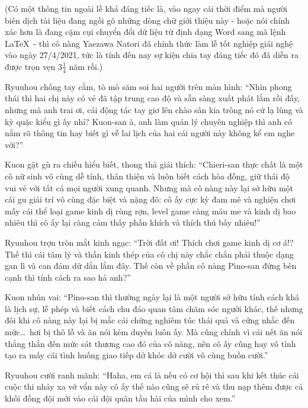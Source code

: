 \documentclass[../main.tex]{subfiles}
\begin{document}
(Có một thông tin ngoài lề khá đáng tiếc là, vào ngay cái thời điểm mà người biên dịch tài liệu đang ngồi gõ những dòng chữ giới thiệu này - hoặc nói chính xác hơn là đang cặm cụi chuyển đổi dữ liệu từ định dạng Word sang mã lệnh \LaTeX\ - thì cô nàng Yaezawa Natori đã chính thức làm lễ tốt nghiệp giải nghệ vào ngày 27/4/2021, tức là tính đến nay sự kiện chia tay đáng tiếc đó đã diễn ra được trọn vẹn 3\(\frac{1}{4}\) năm rồi.)

\chrint


Ryuuhou chống tay cằm, tò mò săm soi hai người trên màn hình: ``Nhìn phong thái thì hai chị này có vẻ đã tập trung cao độ và sẵn sàng xuất phát lắm rồi đấy, nhưng mà anh trai ơi, cái động tác tay giơ lên chào sân kia trông nó cứ lạ lùng và kỳ quặc kiểu gì ấy nhỉ? Kuon-san à, anh làm quản lý chuyên nghiệp thì anh có nắm rõ thông tin hay biết gì về lai lịch của hai cái người này không kể em nghe với?''

Kuon gật gù ra chiều hiểu biết, thong thả giải thích: ``Chieri-san thực chất là một cô nữ sinh vô cùng dễ tính, thân thiện và luôn biết cách hòa đồng, giữ thái độ vui vẻ với tất cả mọi người xung quanh. Nhưng mà cô nàng này lại sở hữu một cái gu giải trí vô cùng đặc biệt và nặng đô: cô ấy cực kỳ đam mê và nghiện chơi mấy cái thể loại game kinh dị rùng rợn, level game càng máu me và kinh dị bao nhiêu thì cô ấy lại càng cảm thấy phấn khích và thích thú bấy nhiêu!''

Ryuuhou trợn tròn mắt kinh ngạc: ``Trời đất ơi! Thích chơi game kinh dị cơ á!? Thế thì cái tâm lý và thần kinh thép của cô chị này chắc chắn phải thuộc dạng gan lì và can đảm dữ dằn lắm đây. Thế còn về phần cô nàng Pino-san đứng bên cạnh thì tính cách ra sao hả anh?''

Kuon nhún vai: ``Pino-san thì thường ngày lại là một người sở hữu tính cách khá là lịch sự, lễ phép và biết cách chu đáo quan tâm chăm sóc người khác, thế nhưng đôi khi cô nàng này lại bị mắc cái chứng nghiêm túc thái quá và cứng nhắc đến mức\dots\ hơi bị thô lỗ và ăn nói kém duyên luôn ấy. Mà cũng chính vì cái nết ăn nói thẳng thắn đến mức sát thương cao đó của cô nàng, nên cô ấy cũng hay vô tình tạo ra mấy cái tình huống giao tiếp dở khóc dở cười vô cùng buồn cười.''

Ryuuhou cười ranh mãnh: ``Haha, em cá là nếu có cơ hội thì sau khi kết thúc cái cuộc thi nhảy xa vớ vẩn này cô ấy thế nào cũng sẽ rủ rê và thu nạp thêm được cả khối đồng đội mới vào cái đội quân tấu hài của mình cho xem.''
\end{document}
